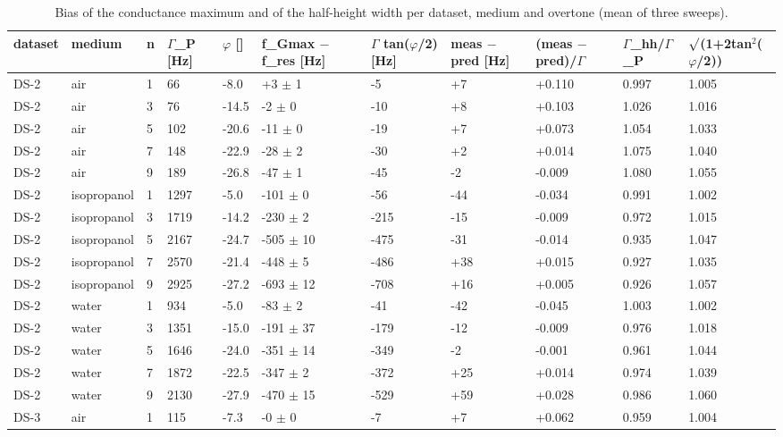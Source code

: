 \documentclass[11pt,a4paper]{article}
\begin{document}
\begin{landscape}{\scriptsize\setlength{\tabcolsep}{2pt}
\begin{longtable}{@{}lllllllllll@{}}
\caption{Bias of the conductance maximum and of the half-height width per dataset, medium and overtone (mean of three sweeps).}\\
\toprule
dataset & medium & n & $\Gamma$\_P [Hz] & $\varphi$ [\textdegree{}] & f\_Gmax $-$ f\_res [Hz] & $\Gamma$ tan($\varphi$/2) [Hz] & meas $-$ pred [Hz] & (meas $-$ pred)/$\Gamma$ & $\Gamma$\_hh/$\Gamma$\_P & $\surd$(1+2tan$^{2}$($\varphi$/2)) \\\midrule\endhead
DS-2 & air & 1 & 66 & -8.0 & +3 $\pm$ 1 & -5 & +7 & +0.110 & 0.997 & 1.005 \\
DS-2 & air & 3 & 76 & -14.5 & -2 $\pm$ 0 & -10 & +8 & +0.103 & 1.026 & 1.016 \\
DS-2 & air & 5 & 102 & -20.6 & -11 $\pm$ 0 & -19 & +7 & +0.073 & 1.054 & 1.033 \\
DS-2 & air & 7 & 148 & -22.9 & -28 $\pm$ 2 & -30 & +2 & +0.014 & 1.075 & 1.040 \\
DS-2 & air & 9 & 189 & -26.8 & -47 $\pm$ 1 & -45 & -2 & -0.009 & 1.080 & 1.055 \\
DS-2 & isopropanol & 1 & 1297 & -5.0 & -101 $\pm$ 0 & -56 & -44 & -0.034 & 0.991 & 1.002 \\
DS-2 & isopropanol & 3 & 1719 & -14.2 & -230 $\pm$ 2 & -215 & -15 & -0.009 & 0.972 & 1.015 \\
DS-2 & isopropanol & 5 & 2167 & -24.7 & -505 $\pm$ 10 & -475 & -31 & -0.014 & 0.935 & 1.047 \\
DS-2 & isopropanol & 7 & 2570 & -21.4 & -448 $\pm$ 5 & -486 & +38 & +0.015 & 0.927 & 1.035 \\
DS-2 & isopropanol & 9 & 2925 & -27.2 & -693 $\pm$ 12 & -708 & +16 & +0.005 & 0.926 & 1.057 \\
DS-2 & water & 1 & 934 & -5.0 & -83 $\pm$ 2 & -41 & -42 & -0.045 & 1.003 & 1.002 \\
DS-2 & water & 3 & 1351 & -15.0 & -191 $\pm$ 37 & -179 & -12 & -0.009 & 0.976 & 1.018 \\
DS-2 & water & 5 & 1646 & -24.0 & -351 $\pm$ 14 & -349 & -2 & -0.001 & 0.961 & 1.044 \\
DS-2 & water & 7 & 1872 & -22.5 & -347 $\pm$ 2 & -372 & +25 & +0.014 & 0.974 & 1.039 \\
DS-2 & water & 9 & 2130 & -27.9 & -470 $\pm$ 15 & -529 & +59 & +0.028 & 0.986 & 1.060 \\
DS-3 & air & 1 & 115 & -7.3 & -0 $\pm$ 0 & -7 & +7 & +0.062 & 0.959 & 1.004 \\

\end{longtable}}
\end{landscape}
\end{document}
